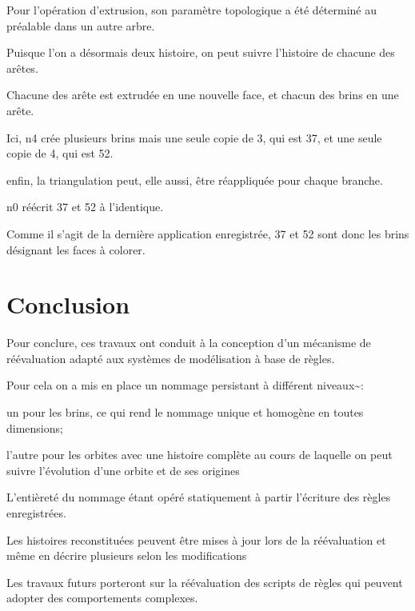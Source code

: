 \documentclass[11pt]{article}
\begin{document}
Pour l'opération d'extrusion, son paramètre topologique a été déterminé au
préalable dans un autre arbre.

Puisque l'on a désormais deux histoire, on peut suivre l'histoire de chacune des
arêtes.

Chacune des arête est extrudée en une nouvelle face, et chacun des brins en une
arête.

Ici, n4 crée plusieurs brins mais une seule copie de 3, qui est 37, et une seule
copie de 4, qui est 52.

enfin, la triangulation peut, elle aussi, être réappliquée pour chaque branche.

n0 réécrit 37 et 52 à l'identique.

Comme il s'agit de la dernière application enregistrée, 37 et 52 sont donc
les brins désignant les faces à colorer.
\section{Conclusion}
\label{sec:orga7a7cfd}
Pour conclure, ces travaux ont conduit à la conception d'un mécanisme de réévaluation adapté aux systèmes de modélisation à base de règles.

Pour cela on a mis en place un nommage persistant à différent niveaux\textasciitilde{}:

un pour les brins, ce qui rend le nommage unique et homogène en toutes
dimensions;

l'autre pour les orbites avec une histoire complète au cours de laquelle on peut
suivre l'évolution d'une orbite et de ses origines

L'entièreté du nommage étant opéré statiquement à partir l'écriture des règles
enregistrées.

Les histoires reconstituées peuvent être mises à jour lors de la réévaluation et
même en décrire plusieurs selon les modifications

Les travaux futurs porteront sur la réévaluation des scripts de règles qui
peuvent adopter des comportements complexes.
\end{document}
